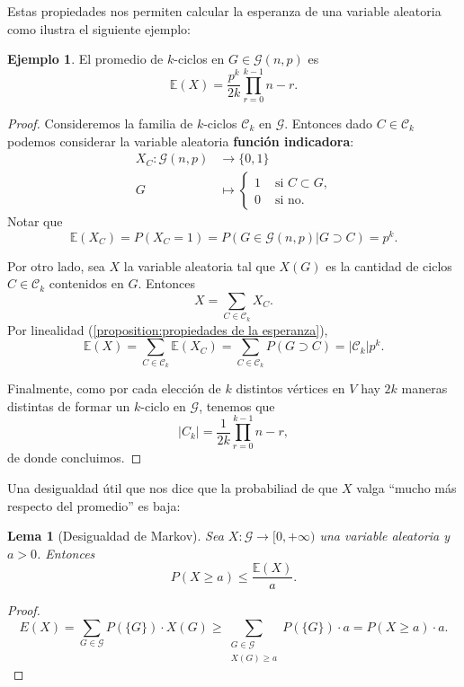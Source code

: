 \documentclass[12pt]{report}
\theoremstyle{plain}
\newtheorem{lemma}[theorem]{Lema}
\theoremstyle{definition}
\newtheorem{example}[theorem]{Ejemplo}
\newcommand{\abs}[1]{\left \vert #1 \right \vert}
\begin{document}
Estas propiedades nos permiten calcular la esperanza de una variable aleatoria como ilustra el siguiente ejemplo:
\begin{example}
El promedio de $k$-ciclos en $G \in \mathcal G (n,p)$ es
\[
    \mathbb{E} (X) = \frac {p^k}{2k} \prod_{r = 0}^{k-1} n - r.
\]
\end{example}
\begin{proof}
Consideremos la familia de $k$-ciclos $\mathcal C_k$ en $\mathcal G$. Entonces dado $C \in \mathcal C_k$ podemos considerar la variable aleatoria \textbf{función indicadora}:
\begin{align*}
X_C : \mathcal G (n,p) &\longrightarrow \{0,1\} \\
G &\longmapsto \begin{cases}
1 &\text{ si $C \subset G$,} \\
0 &\text{ si no.}
\end{cases}
\end{align*}
Notar que
\[
    \mathbb{E} (X_C) = P(X_C = 1) = P(G \in \mathcal G (n,p) | G \supset C) = p^k.
\]

Por otro lado, sea $X$ la variable aleatoria tal que $X (G)$ es la cantidad de ciclos $C \in \mathcal C _k$ contenidos en $G$. Entonces
\[
    X = \sum_{C \in \mathcal C_k} X_C.
\]
Por linealidad (\ref{proposition:propiedades de la esperanza}),
\[
    \mathbb{E}(X) = \sum_{C \in \mathcal C_k} \mathbb{E}(X_C) = \sum_{C \in \mathcal C_k} P (G \supset C) = \abs{\mathcal C_k} p^k.
\]

Finalmente, como por cada elección de $k$ distintos vértices en $V$ hay $2k$ maneras distintas de formar un $k$-ciclo en $\mathcal G$, tenemos que
\[
    \abs{C_k} = \frac{1}{2k} \prod_{r = 0}^{k-1} n - r,
\]
de donde concluimos.
\end{proof}


\bigskip

Una desigualdad útil que nos dice que la probabiliad de que $X$ valga ``mucho más respecto del promedio'' es baja:

\begin{lemma}[Desigualdad de Markov]\label{lema:desigualdad de markov}
Sea $X : \mathcal G \to [0, +\infty)$ una variable aleatoria y $a > 0$. Entonces
\[
    P(X \geq a) \leq \frac{\mathbb{E} (X)}{a}.
\]
\end{lemma}
\begin{proof}
\[
    E(X) = \sum_{G \in \mathcal G} P(\{G\}) \cdot X(G) \geq \sum_{\substack{G \in \mathcal G \\ X(G) \geq a}} P(\{G\}) \cdot a = P(X \geq a) \cdot a.
\]
\end{proof}
\end{document}
